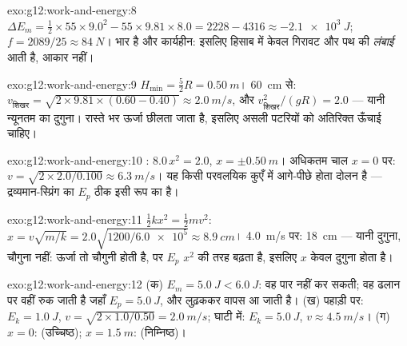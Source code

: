 \begin{solution}{exo:g12:work-and-energy:8}
$\Delta E_m = \tfrac12 \times 55 \times 9.0^2 - 55 \times 9.81 \times
8.0 = 2228 - 4316 \approx \qty{-2.1e3}{J}$; $f = 2089/25 \approx \qty{84}{N}$। भार  है और  कार्यहीन:
इसलिए हिसाब में केवल गिरावट और पथ की \emph{लंबाई} आती है, आकार नहीं।
\end{solution}

\begin{solution}{exo:g12:work-and-energy:9}
$H_{\min} = \tfrac52 R = \qty{0.50}{m}$। \qty{60}{cm} से: $v_{\text{शिखर}} = \sqrt{2 \times 9.81 \times (0.60 - 0.40)} \approx
\qty{2.0}{m/s}$, और $v_{\text{शिखर}}^2/(gR) = 2.0$ --- यानी न्यूनतम का दुगुना।
 रास्ते भर ऊर्जा छीलता जाता है, इसलिए असली पटरियों को
अतिरिक्त ऊँचाई चाहिए।
\end{solution}

\begin{solution}{exo:g12:work-and-energy:10}
: $8.0\,x^2 = 2.0$, $x = \pm\qty{0.50}{m}$। अधिकतम चाल $x = 0$ पर: $v = \sqrt{2 \times 2.0/0.100} \approx
\qty{6.3}{m/s}$। यह किसी
परवलयिक कुएँ में आगे-पीछे होता दोलन है --- द्रव्यमान-स्प्रिंग 
का $E_p$ ठीक इसी रूप का है।
\end{solution}

\begin{solution}{exo:g12:work-and-energy:11}
$\tfrac12 kx^2 = \tfrac12 mv^2$: $x = v\sqrt{m/k} = 2.0\sqrt{1200/\num{6.0e5}} \approx \qty{8.9}{cm}$। \qty{4.0}{m/s} पर: \qty{18}{cm} --- यानी दुगुना, चौगुना नहीं:
ऊर्जा तो चौगुनी होती है, पर $E_p$ $x^2$ की तरह बढ़ता है, इसलिए
$x$ केवल दुगुना होता है।
\end{solution}

\begin{solution}{exo:g12:work-and-energy:12}
(क) $E_m = \qty{5.0}{J} < \qty{6.0}{J}$: वह पार नहीं कर सकती; वह ढलान पर वहीं रुक जाती है जहाँ $E_p = \qty{5.0}{J}$, और
लुढ़ककर वापस आ जाती है। (ख) पहाड़ी पर: $E_k = \qty{1.0}{J}$, $v = \sqrt{2 \times 1.0/0.50} = \qty{2.0}{m/s}$; घाटी में: $E_k = \qty{5.0}{J}$,
$v \approx \qty{4.5}{m/s}$। (ग) $x = 0$:  (उच्चिष्ठ); $x = \qty{1.5}{m}$: 
(निम्निष्ठ)।
\end{solution}


